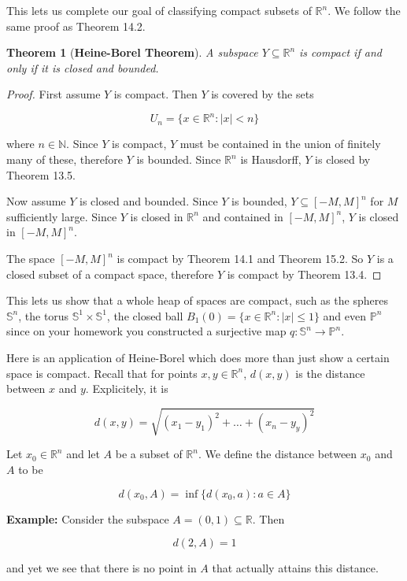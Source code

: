 \documentclass[a4paper]{article}
\newtheorem{theorem}{Theorem}
\numberwithin{theorem}{section}
\begin{document}
This lets us complete our goal of classifying compact subsets of $\mathbb{R}^n$. We follow the same proof as Theorem 14.2.

\begin{theorem}[\textbf{Heine-Borel Theorem}]
A subspace $Y \subseteq \mathbb{R}^n$ is compact if and only if it is closed and bounded.
\end{theorem}

\begin{proof}
First assume $Y$ is compact. Then $Y$ is covered by the sets

$$ U_n = \{x \in \mathbb{R}^n : |x| < n\} $$

where $n \in \mathbb{N}$. Since $Y$ is compact, $Y$ must be contained in the union of finitely many of these, therefore $Y$ is bounded. Since $\mathbb{R}^n$ is Hausdorff, $Y$ is closed by Theorem 13.5.

Now assume $Y$ is closed and bounded. Since $Y$ is bounded, $Y \subseteq [-M,M]^{n}$ for $M$ sufficiently large. Since $Y$ is closed in $\mathbb{R}^n$ and contained in $[-M,M]^{n}$, $Y$ is closed in $[-M,M]^{n}$.

The space $[-M,M]^{n}$ is compact by Theorem 14.1 and Theorem 15.2. So $Y$ is a closed subset of a compact space, therefore $Y$ is compact by Theorem 13.4.
\end{proof}

This lets us show that a whole heap of spaces are compact, such as the spheres $\mathbb{S}^n$, the torus $\mathbb{S}^1 \times \mathbb{S}^1$, the closed ball $B_1(0) = \{x \in \mathbb{R}^n : |x| \leq 1\}$ and even $\mathbb{P}^n$ since on your homework you constructed a surjective map $q: \mathbb{S}^n \rightarrow \mathbb{P}^n$.

Here is an application of Heine-Borel which does more than just show a certain space is compact. Recall that for points $x,y \in \mathbb{R}^n$, $d(x,y)$ is the distance between $x$ and $y$. Explicitely, it is 

$$ d(x,y) = \sqrt{ (x_1-y_1)^2 + \dots + (x_n-y_y)^2 } $$

Let $x_0 \in \mathbb{R}^n$ and let $A$ be a subset of $\mathbb{R}^n$. We define the distance between $x_0$ and $A$ to be 

$$ d(x_0, A) = \inf \{ d(x_0,a) : a \in A \} $$

\textbf{Example:} Consider the subspace $A = (0,1) \subseteq \mathbb{R}$. Then 

$$ d(2,A) = 1 $$

and yet we see that there is no point in $A$ that actually attains this distance.
\end{document}
